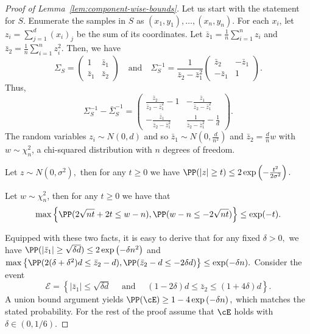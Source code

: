 \begin{proof}[Proof of Lemma~\ref{lem:component-wise-bounds}]
 Let us start with the statement for $S$. Enumerate the samples in $S$ as $(x_1, y_1), \dots, (x_n, y_n).$ For each $x_i$, let $z_i = \sum_{j = 1}^d (x_i)_j$ be the sum of its coordinates. Let $\bar z_1 = \frac{1}{n} \sum_{i=1}^n z_i$ and $\bar z_2 = \frac{1}{n} \sum_{i=1}^n z_i^2.$ Then, we have
 \begin{equation}\label{eq:cov-S}
     \Sigma_S = \begin{pmatrix}
         1 & \bar z_1 \\
          \bar z_1 &  \bar z_2 
     \end{pmatrix}  \quad \text{and} \quad \Sigma_S^{-1} = \frac{1}{\bar z_2 - \bar z_1^2} \begin{pmatrix}
          \bar z_2  & - \bar z_1 \\
          - \bar z_1 &  1
     \end{pmatrix}.
 \end{equation}
 Thus, 
 \begin{equation*}
     \Sigma_S^{-1} - \bar \Sigma_S^{-1} = \begin{pmatrix}
          \frac{\bar z_2}{\bar z_2 - \bar z_1^2} - 1  & - \frac{\bar z_1}{\bar z_2 - \bar z_1^2} \\
          - \frac{\bar z_1}{\bar z_2 - \bar z_1^2}&  \frac{1}{\bar z_2 - \bar z_1^2} - \frac{1}{d}
     \end{pmatrix}.
 \end{equation*}
The random variables $z_i \sim N(0, d)$ and so $\bar z_1 \sim N(0, \frac{d}{n^2})$ and $\bar z_2 =  \frac{d}{n} w $ with $w \sim \chi^2_n$, a chi-squared distribution with $n$ degrees of freedom.
\begin{fact}
    Let $z \sim N(0, \sigma^2),$ then for any $t \geq 0$ we have $\PP(|z| \geq t) \leq 2 \exp\left(-\frac{t^2}{2\sigma^2}\right).$
\end{fact}
\begin{fact}
    Let $w \sim \chi_n^2$, then for any $t \geq 0$ we have that $$\max\left\{\PP( 2\sqrt{n t} + 2t \leq w - n), \PP( w - n \leq - 2\sqrt{n t})\right\} \leq \exp(-t).$$
\end{fact}
Equipped with these two facts, it is easy to derive that for any fixed $\delta > 0,$  we have $\PP(|\bar z_1| \geq  \sqrt{\delta d}) \leq 2 \exp\left(- {\delta n^2}\right)$ and $\max\left\{\PP(2(\delta+\delta^2)d \leq \bar z_2 -d), \PP (\bar z_2 - d \leq -2\delta d) \right\}\leq \exp(-\delta n).$ Consider the event $$
\mathcal{E} = \left\{|\bar z_1 | \leq \sqrt{\delta d} \quad \text{ and } \quad (1 - 2\delta) d \leq \bar z_2 \leq ( 1+4 \delta) d \right\}.
$$
A union bound argument yields $\PP(\cE) \geq 1 - 4\exp\left(-\delta n \right),$ which matches the stated probability. For the rest of the proof assume that $\cE$ holds with $\delta \in (0, 1/6)$.


\end{proof}
